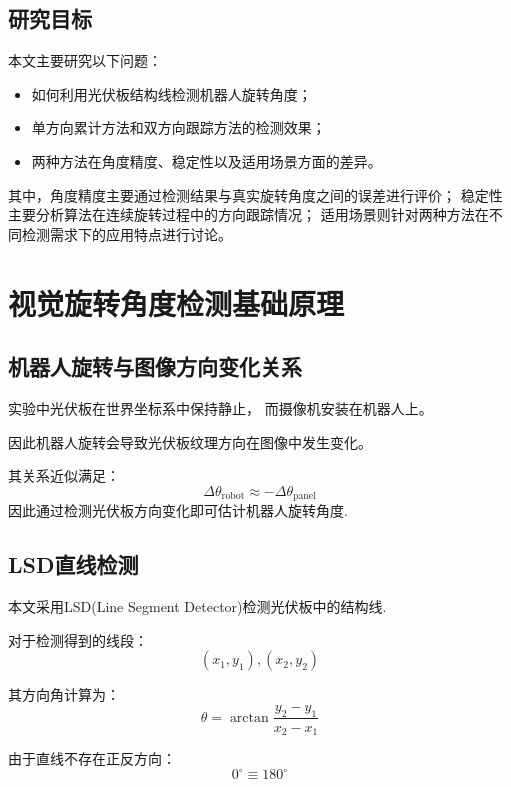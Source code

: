 \documentclass[UTF8,a4paper,12pt]{ctexart}
\begin{document}
	\subsection{研究目标} 
	本文主要研究以下问题： 
	\begin{itemize} 
		\item 如何利用光伏板结构线检测机器人旋转角度； 
		\item 单方向累计方法和双方向跟踪方法的检测效果； 
		\item 两种方法在角度精度、稳定性以及适用场景方面的差异。 
	\end{itemize} 
	
	其中，角度精度主要通过检测结果与真实旋转角度之间的误差进行评价； 
	稳定性主要分析算法在连续旋转过程中的方向跟踪情况； 
	适用场景则针对两种方法在不同检测需求下的应用特点进行讨论。 
	
	\FloatBarrier 
	
	
	
	\section{视觉旋转角度检测基础原理} 
	\subsection{机器人旋转与图像方向变化关系} 
	实验中光伏板在世界坐标系中保持静止， 
	而摄像机安装在机器人上。 
	
	因此机器人旋转会导致光伏板纹理方向在图像中发生变化。 
	
	其关系近似满足： 
	\begin{equation} 
		\Delta\theta_{\text{robot}} 
		\approx 
		-\Delta\theta_{\text{panel}} 
	\end{equation} 
	因此通过检测光伏板方向变化即可估计机器人旋转角度. 
	
	\subsection{LSD直线检测} 
	本文采用LSD(Line Segment Detector)检测光伏板中的结构线. 
	
	对于检测得到的线段： 
	\[ 
	(x_1,y_1),(x_2,y_2) 
	\] 
	
	其方向角计算为： 
	\begin{equation} 
		\theta= 
		\arctan 
		\frac{y_2-y_1}{x_2-x_1} 
	\end{equation} 
	
	由于直线不存在正反方向： 
	\begin{equation} 
		0^\circ\equiv180^\circ 
	\end{equation} 
	
\end{document}
